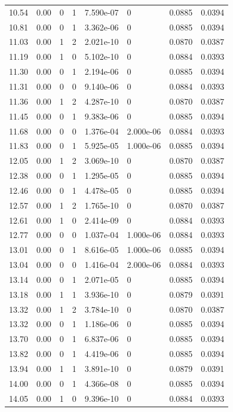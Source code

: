 \documentclass[preview]{standalone}
\begin{document}
{{{\begin{tabular}{L{1.2cm}C{1.2cm} C{0.3cm}C{0.5cm} C{1.4cm}C{1.4cm} C{1.4cm}C{1.4cm}}
  10.54  &  0.00  & 0     &  1 &  7.590e-07  & 0  & 0.0885 &  0.0394   \\ 
  10.81  &  0.00  & 0     &  1 &  3.362e-06  & 0  & 0.0885 &  0.0394   \\ 
  11.03  &  0.00  & 1     &  2 &  2.021e-10  & 0  & 0.0870 &  0.0387   \\ 
  11.19  &  0.00  & 1     &  0 &  5.102e-10  & 0  & 0.0884 &  0.0393   \\ 
  11.30  &  0.00  & 0     &  1 &  2.194e-06  & 0  & 0.0885 &  0.0394   \\ 
  11.31  &  0.00  & 0     &  0 &  9.140e-06  & 0  & 0.0884 &  0.0393   \\ 
  11.36  &  0.00  & 1     &  2 &  4.287e-10  & 0  & 0.0870 &  0.0387   \\ 
  11.45  &  0.00  & 0     &  1 &  9.383e-06  & 0  & 0.0885 &  0.0394   \\ 
  11.68  &  0.00  & 0     &  0 &  1.376e-04  & 2.000e-06  & 0.0884 &  0.0393   \\ 
  11.83  &  0.00  & 0     &  1 &  5.925e-05  & 1.000e-06  & 0.0885 &  0.0394   \\ 
  12.05  &  0.00  & 1     &  2 &  3.069e-10  & 0  & 0.0870 &  0.0387   \\ 
  12.38  &  0.00  & 0     &  1 &  1.295e-05  & 0  & 0.0885 &  0.0394   \\ 
  12.46  &  0.00  & 0     &  1 &  4.478e-05  & 0  & 0.0885 &  0.0394   \\ 
  12.57  &  0.00  & 1     &  2 &  1.765e-10  & 0  & 0.0870 &  0.0387   \\ 
  12.61  &  0.00  & 1     &  0 &  2.414e-09  & 0  & 0.0884 &  0.0393   \\ 
  12.77  &  0.00  & 0     &  0 &  1.037e-04  & 1.000e-06  & 0.0884 &  0.0393   \\ 
  13.01  &  0.00  & 0     &  1 &  8.616e-05  & 1.000e-06  & 0.0885 &  0.0394   \\ 
  13.04  &  0.00  & 0     &  0 &  1.416e-04  & 2.000e-06  & 0.0884 &  0.0393   \\ 
  13.14  &  0.00  & 0     &  1 &  2.071e-05  & 0  & 0.0885 &  0.0394   \\ 
  13.18  &  0.00  & 1     &  1 &  3.936e-10  & 0  & 0.0879 &  0.0391   \\ 
  13.32  &  0.00  & 1     &  2 &  3.784e-10  & 0  & 0.0870 &  0.0387   \\ 
  13.32  &  0.00  & 0     &  1 &  1.186e-06  & 0  & 0.0885 &  0.0394   \\ 
  13.70  &  0.00  & 0     &  1 &  6.837e-06  & 0  & 0.0885 &  0.0394   \\ 
  13.82  &  0.00  & 0     &  1 &  4.419e-06  & 0  & 0.0885 &  0.0394   \\ 
  13.94  &  0.00  & 1     &  1 &  3.891e-10  & 0  & 0.0879 &  0.0391   \\ 
  14.00  &  0.00  & 0     &  1 &  4.366e-08  & 0  & 0.0885 &  0.0394   \\ 
  14.05  &  0.00  & 1     &  0 &  9.396e-10  & 0  & 0.0884 &  0.0393   \\ 
\hline 
\end{tabular} 

}}}
\end{document}
